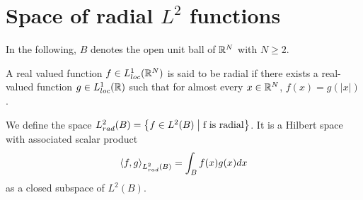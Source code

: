 \documentclass[11pt,a4paper]{article}
\begin{document}
\section{Space of radial $L^2$ functions}

In the following, $B$ denotes the open unit ball of $\mathbb{R}^N$ with $N \geq 2$. 

\begin{Def} A real valued function $f \in L^1_{loc}(\mathbb{R}^N)$ is said to be radial if there exists a real-valued function $g \in L^1_{loc}(\mathbb{R})$ such that for almost every $x\in \mathbb{R}^N$, $f(x) = g(|x|)$.  
\end{Def}

\begin{Def} We define the space $L^2_{rad}(B) = \left\{f \in L^2(B)\mathrel{}\middle|\mathrel{}\text{f is radial}\right\}$. It is a Hilbert space with associated scalar product \[\left\langle f,g\right\rangle_{L^2_{rad}(B)} = \int_{B}f(x)g(x)dx\]
as a closed subspace of $L^2(B)$.
\end{Def}
\end{document}
